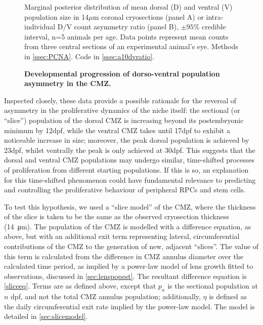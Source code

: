 \begin{figure}[!h]
    \caption{{\bf Developmental progression of dorso-ventral population asymmetry in the CMZ.}}
    Marginal posterior distribution of mean dorsal (D) and ventral (V) population size in 14$\mu$m coronal cryosections (panel A) or intra-individual D/V count asymmetry ratio (panel B), $\pm 95\%$ credible interval, n=5 animals per age. Data points represent mean counts from three central sections of an experimental animal's eye. 
    \label{DVontology}
    Methods in \autoref{ssec:PCNA}.
    Code in \autoref{ssec:a10dvratio}. 
\end{figure}

Inspected closely, these data provide a possible rationale for the reversal of asymmetry in the proliferative dynamics of the niche itself: the sectional (or ``slice'') population of the dorsal CMZ is increasing beyond its postembryonic minimum by 12dpf, while the ventral CMZ takes until 17dpf to exhibit a noticeable increase in size; moreover, the peak dorsal population is achieved by 23dpf, whilst ventrally the peak is only achieved at 30dpf. This suggests that the dorsal and ventral CMZ populations may undergo similar, time-shifted processes of proliferation from different starting populations. If this is so, an explanation for this time-shifted phenomenon could have fundamental relevance to predicting and controlling the proliferative behaviour of peripheral RPCs and stem cells.

To test this hypothesis, we used a ``slice model'' of the CMZ, where the thickness of the slice is taken to be the same as the observed cryosection thickness (\SI{14}{\micro\metre}). The population of the CMZ is modelled with a difference equation, as above, but with an additional exit term representing lateral, circumferential contributions of the CMZ to the generation of new, adjacent ``slices''. The value of this term is calculated from the difference in CMZ annulus diameter over the calculated time period, as implied by a power-law model of lens growth fitted to observations, discussed in \autoref{sec:lenspopest}. The resultant difference equation is \autoref{sliceeq}. Terms are as defined above, except that $p_n$ is the sectional population at $n$ dpf, and not the total CMZ annulus population; additionally, $\eta$ is defined as the daily circumferential exit rate implied by the power-law model. The model is detailed in \autoref{sec:slicemodel}.

